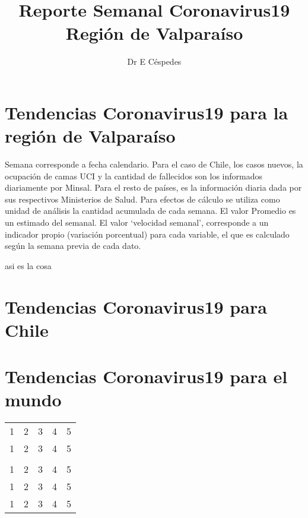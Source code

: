 \documentclass{article}
\title{Reporte Semanal Coronavirus19 Región de Valparaíso}
\author{Dr E Céspedes}
\date{\Fecha}
\begin{document}
\maketitle
\tableofcontents
 


\section{Tendencias Coronavirus19 para la región de Valparaíso}

Semana corresponde a fecha calendario. Para el caso de Chile, los casos nuevos, la ocupación de camas UCI y la cantidad de fallecidos son los informados diariamente por Minsal. Para el resto de países, es la información diaria dada por sus respectivos Ministerios de Salud. Para efectos de cálculo se utiliza como unidad de análisis la cantidad acumulada de cada semana. El valor Promedio es un estimado del semanal. El valor ‘velocidad semanal’, corresponde a un indicador propio (variación porcentual) para cada variable, el que es calculado según la semana previa de cada dato.
\begin{table}[h]
\caption{esta tabla es muy bonita}
\end{table}

asi es la cosa



\section{Tendencias Coronavirus19 para Chile}



\section{Tendencias Coronavirus19 para el mundo}



\begin{table}[]
\begin{tabular}{lllll}
1 & 2 & 3 & 4 & 5 \\

1 & 2 & 3 & 4 & 5 \\\\
1 & 2 & 3 & 4 & 5 \\
1 & 2 & 3 & 4 & 5 \\
1 & 2 & 3 & 4 & 5 \\
\end{tabular}
\end{table}
\end{document}
